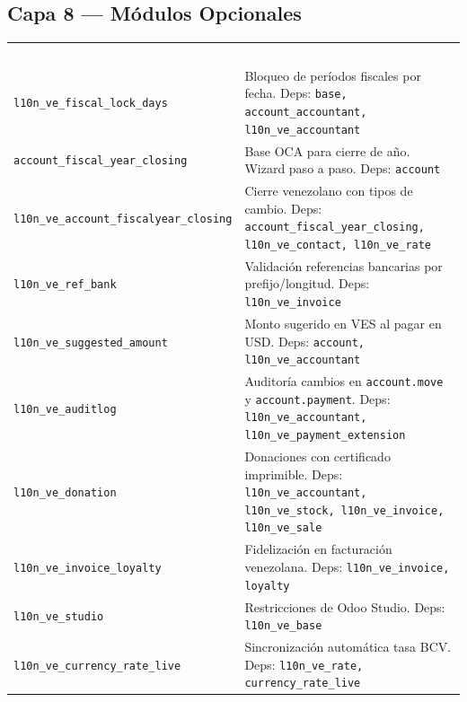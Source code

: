 \documentclass[11pt,a4paper]{article}
\newcommand{\modulo}[1]{\texttt{\textcolor{naranja}{#1}}}
\newcommand{\tchead}[1]{%
  \cellcolor{naranja}\textcolor{white}{\textbf{#1}}%
}
\begin{document}
\begin{Form}
\subsection{Capa 8 — Módulos Opcionales}

\begin{center}
\begin{tabular}{L{4.2cm} L{9.8cm}}
  \tchead{Módulo} & \tchead{Descripción} \\
  \modulo{l10n\_ve\_fiscal\_lock\_days} & Bloqueo de períodos fiscales por fecha. Deps: \texttt{base, account\_accountant, l10n\_ve\_accountant} \\
  \modulo{account\_fiscal\_year\_closing} & Base OCA para cierre de año. Wizard paso a paso. Deps: \texttt{account} \\
  \modulo{l10n\_ve\_account\_fiscalyear\_closing} & Cierre venezolano con tipos de cambio. Deps: \texttt{account\_fiscal\_year\_closing, l10n\_ve\_contact, l10n\_ve\_rate} \\
  \modulo{l10n\_ve\_ref\_bank} & Validación referencias bancarias por prefijo/longitud. Deps: \texttt{l10n\_ve\_invoice} \\
  \modulo{l10n\_ve\_suggested\_amount} & Monto sugerido en VES al pagar en USD. Deps: \texttt{account, l10n\_ve\_accountant} \\
  \modulo{l10n\_ve\_auditlog} & Auditoría cambios en \texttt{account.move} y \texttt{account.payment}. Deps: \texttt{l10n\_ve\_accountant, l10n\_ve\_payment\_extension} \\
  \modulo{l10n\_ve\_donation} & Donaciones con certificado imprimible. Deps: \texttt{l10n\_ve\_accountant, l10n\_ve\_stock, l10n\_ve\_invoice, l10n\_ve\_sale} \\
  \modulo{l10n\_ve\_invoice\_loyalty} & Fidelización en facturación venezolana. Deps: \texttt{l10n\_ve\_invoice, loyalty} \\
  \modulo{l10n\_ve\_studio} & Restricciones de Odoo Studio. Deps: \texttt{l10n\_ve\_base} \\
  \modulo{l10n\_ve\_currency\_rate\_live} & Sincronización automática tasa BCV. Deps: \texttt{l10n\_ve\_rate, currency\_rate\_live} \\
\end{tabular}
\end{center}


\end{Form}
\end{document}
